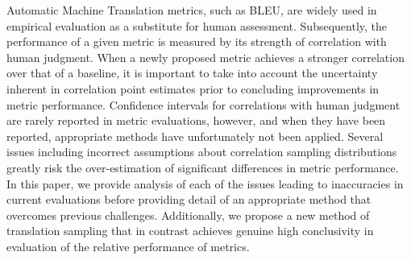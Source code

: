 Automatic Machine Translation metrics, such as BLEU, are widely used in empirical evaluation as a substitute for human assessment. Subsequently, the performance of a given metric is measured by its strength of correlation with human judgment. When a newly proposed metric achieves a stronger correlation over that of a baseline, it is important to take into account the uncertainty inherent in correlation point estimates prior to concluding improvements in metric performance. Confidence intervals for correlations with human judgment are rarely reported in metric evaluations, however, and when they have been reported, appropriate methods have unfortunately not been applied. Several issues including incorrect assumptions about correlation sampling distributions greatly risk the over-estimation of significant differences in metric performance. In this paper, we provide analysis of each of the issues leading to inaccuracies in current evaluations before providing detail of an appropriate method that overcomes previous challenges. Additionally, we propose a new method of translation sampling that in contrast achieves genuine high conclusivity in evaluation of the relative performance of metrics.
